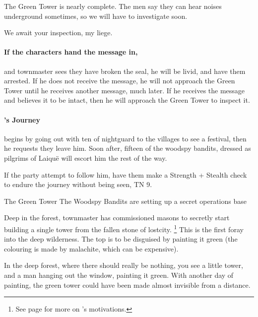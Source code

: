 \begin{multicols}{2}
\begin{speechtext}
  The Green Tower is nearly complete.
  The men say they can hear noises underground sometimes, so we will have to investigate soon.

  We await your inspection, my liege.

\end{speechtext}

\paragraph{If the characters hand the message in,}
and \gls{townmaster} sees they have broken the seal, he will be livid, and have them arrested.
If he does not receive the message, he will not approach the Green Tower until he receives another message, much later.
If he receives the message and believes it to be intact, then he will approach the Green Tower to inspect it.

\paragraph{'s Journey}
begins by going out with ten of \gls{nightguard} to the villages to see a festival, then he requests they leave him.
Soon after, fifteen of the woodspy bandits, dressed as pilgrims of Laiqu\"e will escort him the rest of the way.

If the party attempt to follow him, have them make a Strength + Stealth check to endure the journey without being seen, TN 9.


{The Green Tower}%
{The Woodspy Bandits are setting up a secret operations base}%

Deep in the forest, \gls{townmaster} has commissioned masons to secretly start building a single tower from the fallen stone of \gls{lostcity}.
\footnote{See page \pageref{expanding_wilderness} for more on 's motivations.}
This is the first foray into the deep wilderness.
The top is to be disguised by painting it green (the colouring is made by malachite, which can be expensive).

\begin{boxtext}

  In the deep forest, where there should really be nothing, you see a little tower, and a man hanging out the window, painting it green.
  With another day of painting, the green tower could have been made almost invisible from a distance.


\end{boxtext}
\end{multicols}
